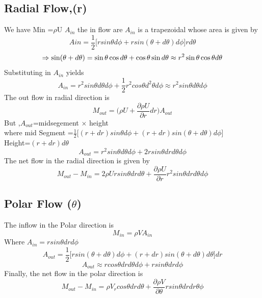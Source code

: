 \documentclass[a4paper, 12pt]{report}
\begin{document}
\subsection{Radial Flow,(r)}
We have Min =$\rho$U $A_{in}$ the in flow are $A_{in}$ is a trapezoidal whose area is given by\newline
\begin{equation*}
	Ain=\frac{1}{2}\bigg[rsin\theta d\phi +rsin(\theta+d\theta)d\phi\bigg]rd\theta
\end{equation*}
\begin{equation*}
	\Rightarrow \sin(\theta+d\theta)=\sin\theta \cos d\theta + \cos\theta \sin d\theta \approx r^2 \sin\theta \cos\theta d\theta\\
\end{equation*}
Substituting in $A_{in}$ yields
\begin{equation*}
	A_{in}=r^2sin\theta d\theta d\phi +\frac{1}{2}r^2 cos\theta d^2\theta d\phi \approx r^2sin\theta d\theta d\phi
\end{equation*}
The out flow in radial direction is
\begin{equation*}
	M_{out}=\bigg(\rho U+\frac{\partial \rho U}{\partial r}dr\bigg)A_{out}
\end{equation*}
But ,$A_{out}$=midsegement $\times$ height\\
where mid Segment =$\frac{1}{2}\bigg[(r+dr)sin\theta d\phi +(r+dr)sin(\theta+d\theta)d\phi\bigg]$\\
Height=$(r+dr)d\theta$ \newline
\begin{equation*}
	A_{out}=r^2sin\theta d\theta d\phi +2rsin\theta dr d\theta d\phi
\end{equation*}
The net flow in the radial direction is given by
\begin{equation*}
	M_{out}-M_{in}=2\rho Ur sin\theta dr d\theta+\frac{\partial \rho U}{\partial r}r^2 sin\theta drd\theta d\phi
\end{equation*}

\subsection{Polar Flow ($\theta$)}
The inflow in the Polar direction is 
\begin{equation*}
	M_{in}=\rho VA_{in}
\end{equation*}
Where $A_{in}=rsin\theta drd\phi$
\begin{equation*}
	A_{out}=\frac{1}{2}\bigg[rsin(\theta+d\theta)d\phi +(r+dr)sin(\theta+d\theta)d\theta\bigg]dr
\end{equation*}
\begin{equation*}
	A_{out}\approx r cos\theta drd\theta d\phi +rsin\theta drd\phi
\end{equation*}
Finally, the net flow in the polar direction is 
\begin{equation*}
	M_{out}-M_{in}=\rho V_r cos \theta dr d\theta+\frac{\partial \rho V}{\partial \theta}r sin\theta dr dr\theta\phi
\end{equation*}
\end{document}
